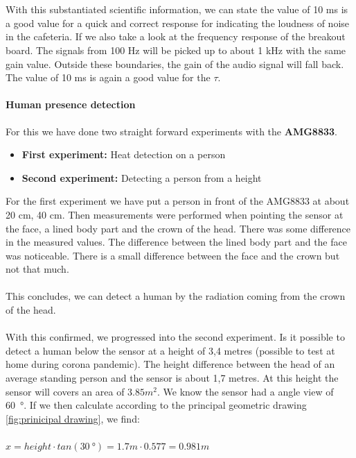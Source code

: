 \documentclass[11pt,a4paper]{article}
\begin{document}
\\ \\ With this substantiated scientific information, we can state the value of 10 ms is a good value for a quick and correct response for indicating the loudness of noise in the cafeteria. If we also take a look at the frequency response of the breakout board. The signals from 100 Hz will be picked up to about 1 kHz with the same gain value. Outside these boundaries, the gain of the audio signal will fall back. The value of 10 ms is again a good value for the $\tau$.


\paragraph{Human presence detection}
For this we have done two straight forward experiments with the \textbf{AMG8833}.
\begin{itemize}
\item \textbf{First experiment:} Heat detection on a person
\item \textbf{Second experiment:} Detecting a person from a height
\end{itemize}
For the first experiment we have put a person in front of the AMG8833 at about 20 cm, 40 cm. Then measurements were performed when pointing the sensor at the face, a lined body part and the crown of the head. There was some difference in the measured values. The  difference between the lined body part and the face was noticeable. There is a small difference between the face and the crown but not that much. 
\\ \\ 
This concludes, we can detect a human by the radiation coming from the crown of the head.
\\ \\
With this confirmed, we progressed into the second experiment. Is it possible to detect a human below the sensor at a height of 3,4 metres (possible to test at home during corona pandemic). The height difference between the head of an average standing person and the sensor is about 1,7 metres. At this height the sensor will covers an area of $3.85 m^2$. We know the sensor had a angle view of \SI{60}{\degree}. If we then calculate according to the principal geometric drawing \ref{fig:prinicipal drawing},  we find:
\\ \\
$ x = height \cdot tan (\SI{30}{\degree}) = 1.7 m \cdot 0.577 = 0.981 m$
\\ \\
\end{document}

